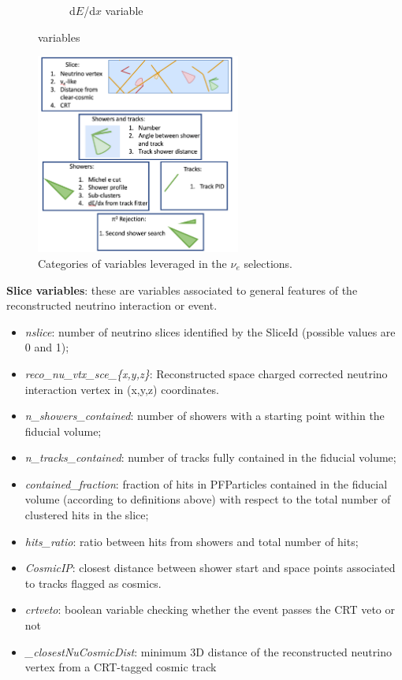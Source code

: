 \documentclass[a4paper]{article}
\begin{document}
\begin{figure}[H]
\begin{center}
\begin{subfigure}[b]{0.3\textwidth}
    \caption{\label{fig:nue:variables:dedx} d$E$/d$x$ variable }
    \end{subfigure}
\caption{\label{fig:nue:presel:eff} variables}
\end{center}
\end{figure}

\begin{figure}[H]
\begin{center}
\includegraphics[width=0.6\textwidth]{nueselection/tools.png}
\caption{\label{fig:nue:variables}Categories of variables leveraged in the $\nu_e$ selections.}
\end{center}
\end{figure}

\par \noindent  \textbf{Slice variables}: these are variables associated to general features of the reconstructed neutrino interaction or event.

\begin{itemize}
    \item \emph{nslice}: number of neutrino slices identified by the SliceId (possible values are 0 and 1);
    \item \emph{reco\_nu\_vtx\_sce\_\{x,y,z\}}: Reconstructed space charged corrected neutrino interaction vertex in (x,y,z) coordinates.
    \item \emph{n\_showers\_contained}: number of showers with a starting point within the fiducial volume;
    \item \emph{n\_tracks\_contained}: number of tracks fully contained in the fiducial volume;
    \item \emph{contained\_fraction}: fraction of hits in PFParticles contained in the fiducial volume (according to definitions above) with respect to the total number of clustered hits in the slice;
    \item \emph{hits\_ratio}: ratio between hits from showers and total number of hits;
    \item \emph{CosmicIP}: closest distance between shower start and space points associated to tracks flagged as cosmics.
    \item \emph{crtveto}: boolean variable checking whether the event passes the CRT veto or not
    \item \emph{\_closestNuCosmicDist}: minimum 3D distance of the reconstructed neutrino vertex from a CRT-tagged cosmic track
\end{itemize}
\end{document}
